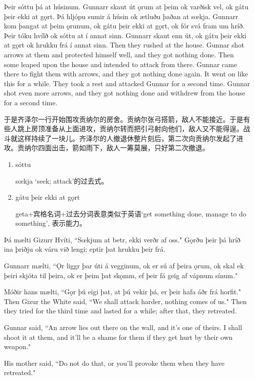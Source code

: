 \begin{paracol}{2}
  Þeir sóttu þá at húsinum. Gunnarr skaut út ǫrum at þeim ok varðisk vel, ok gátu þeir ekki at gǫrt. Þá hljópu sumir á húsin ok ætluðu þaðan at sœkja. Gunnarr kom þangat at þeim ǫrunum, ok gátu þeir ekki at gǫrt, ok fór svá fram um hríð. Þeir tóku hvílð ok sóttu at í annat sinn. Gunnarr skaut enn út, ok gátu þeir ekki at gǫrt ok hrukku frá í annat sinn.
  \switchcolumn
  Then they rushed at the house. Gunnar shot arrows at them and protected himself well, and they got nothing done. Then some leaped upon the house and intended to attack from there. Gunnar came there to fight them with arrows, and they got nothing done again. It went on like this for a while. They took a rest and attacked Gunnar for a second time. Gunnar shot even more arrows, and they got nothing done and withdrew from the house for a second time.
\end{paracol}
\begin{translation*}{}
  于是齐泽尔一行开始围攻贡纳尔的房舍。贡纳尔张弓搭箭，敌人不能接近。于是有些人跳上房顶准备从上面进攻，贡纳尔转而把引弓射向他们，敌人又不能得逞。战斗就这样持续了一块儿。齐泽尔的人撤退休整片刻后，第二次向贡纳尔发起了进攻。贡纳尔四面出击，箭如雨下，敌人一筹莫展，只好第二次撤退。
\end{translation*}
\begin{grammar*}{}
  \begin{enumerate}[leftmargin=*]
    \item sóttu

          sœkja `seek; attack'的过去式。

    \item gátu þeir ekki at gǫrt

          geta+宾格名词+过去分词表意类似于英语`get something done, manage to do something', 表示能力。
  \end{enumerate}
\end{grammar*}
\begin{paracol}{2}
  Þá mælti Gizurr Hvíti, ``Sœkjum at betr, ekki verðr af oss." Gǫrðu þeir þá hríð ina þriðju ok váru við lengi; eptir þat hrukku þeir frá.

  Gunnarr mælti, ``Ǫr liggr þar úti á vegginum, ok er sú af þeira ǫrum, ok skal ek þeiri skjóta til þeira, ok er þeim þat skǫmm, ef þeir fá geig af vápnum sínum."

  Móðir hans mælti, ``Gǫr þú eigi þat, at þú vekir þá, er þeir hafa áðr frá horfit."
  \switchcolumn
  Then Gizur the White said, ``We shall attack harder, nothing comes of us." Then they tried for the third time and lasted for a while; after that, they retreated.

  Gunnar said, ``An arrow lies out there on the wall, and it's one of theirs. I shall shoot it at them, and it'll be a shame for them if they get hurt by their own weapon."

  His mother said, ``Do not do that, or you'll provoke them when they have retreated."
\end{paracol}
